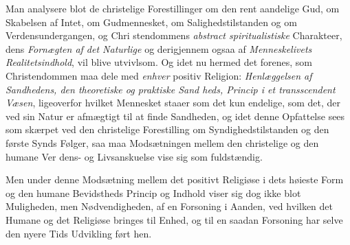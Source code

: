 \begin{enumerate}[label=\arabic*., leftmargin=*, labelsep=1em,
                  topsep=0.35\baselineskip, itemsep=0.35\baselineskip]
 Man analysere blot de christelige Forestillinger om den rent aandelige Gud, om
  Skabelsen af Intet, om Gudmennesket, om Salighedstilstanden og om
  Verdensundergangen, og Chri\-%
stendommens \emph{abstract spiritualistiske} Charakteer, dens \emph{Fornægten af
  det Naturlige} og derigjennem ogsaa af \emph{Menneskelivets Realitetsindhold},
  vil blive utvivlsom. Og idet nu hermed det forenes, som Christendommen maa dele
  med \emph{enhver} positiv Religion: \emph{Henlæggelsen af Sandhedens, den
  theoretiske og praktiske Sand\-%
heds, Princip i et transscendent Væsen}, ligeoverfor hvilket Mennesket staaer som
  det kun endelige, som det, der ved sin Natur er afmægtigt til at finde
  Sandheden, og idet denne Opfattelse sees som skærpet ved den christelige
  Forestilling om Syndighedstilstanden og den første Synds Følger, saa maa
  Modsætningen mellem den christelige og den humane Ver\-%
dens- og Livsanskuelse vise sig som fuldstændig.

  Men under denne Modsætning mellem det positivt Religiøse i dets høieste Form og
  den humane Bevidstheds Princip og Indhold viser sig dog ikke blot Muligheden,
  men Nødvendigheden, af en Forsoning i Aanden, ved hvilken det Humane og det
  Religiøse bringes til Enhed, og til en saadan Forsoning har selve den nyere
  Tids Udvikling ført hen.


\end{enumerate}
